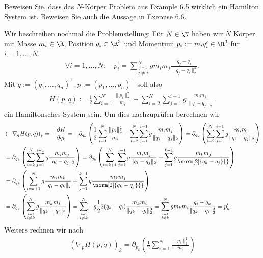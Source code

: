 \begin{exercise}
  Beweisen Sie, dass das $N$-Körper Problem aus Example 6.5
  wirklich ein Hamilton System ist. Beweisen Sie auch die
  Aussage in Exercise 6.6.
\end{exercise}

\begin{solution}
  Wir beschreiben nochmal die Problemstellung: Für $N \in \N$ haben wir $N$ Körper
  mit Masse $m_i \in \R$, Position $q_i \in \R^3$ und Momentum $p_i := m_iq_i^{\prime} \in \R^3$
  für $i = 1,\dots,N$.
  \begin{align*}
    \forall i = 1,\dots,N: \quad p_i^{\prime} = \sum_{\stackrel{j = 1}{j \neq i}}^N gm_im_j \frac{q_j - q_i}{\|q_j - q_i\|_2^3}.
  \end{align*}
  Mit $q := (q_1,\dots,q_n)^{\top}, p := (p_1,\dots,p_n)^{\top}$ soll also
  \begin{align*}
    H(p,q) := \frac{1}{2}\sum_{i=1}^N \frac{\|p_i\|_2^2}{m_i}- \sum_{i = 2}^N\sum_{j=1}^{i-1}g\frac{m_im_j}{\|q_i-q_j\|_2}.
  \end{align*}
  ein Hamiltonsches System sein. Um dies nachzuprüfen berechnen wir
  \begin{align*}
     & \left(- \nabla_q H(p,q)\right)_k = - \frac{\partial H}{\partial q_k}
    = -\partial_{q_k}\left(\frac{1}{2}\sum_{i=1}^N \frac{\|p_i\|_2^2}{m_i}- \sum_{i = 2}^N\sum_{j=1}^{i-1}g\frac{m_im_j}{\|q_i-q_j\|_2}\right)
    = \partial_{q_k}\left(\sum_{i = 2}^N\sum_{j=1}^{i-1}g\frac{m_im_j}{\|q_i-q_j\|_2}\right) \\
    &= \partial_{q_k}\left(\sum_{i = k}^N\sum_{j=1}^{i-1}g\frac{m_im_j}{\|q_i-q_j\|_2}\right)
    = \partial_{q_k}\left(\sum_{i = k+1}^N \sum_{j=1}^{i-1}g\frac{m_im_j}{\|q_i-q_j\|_2}
    + \sum_{j=1}^{k-1}g\frac{m_k m_j}{\norm[2]{q_k-q_j}{}} \right) \\
    &= \partial_{q_k}\left(\sum_{i = k+1}^N g\frac{m_im_k}{\|q_i-q_k\|_2}
    + \sum_{j=1}^{k-1}g\frac{m_k m_j}{\norm[2]{q_k-q_j}{}}\right)\\
    &= \partial_{q_k}\left(\sum_{\stackrel{i = 1}{i \neq k}}^{N}g\frac{m_km_i}{\|q_k-q_i\|_2}\right)
    = \sum_{\stackrel{i = 1}{i \neq k}}^{N}-g\frac{1}{2}2(q_k - q_i)\frac{m_km_i}{\|q_k-q_i\|_2^3}
    = \sum_{\stackrel{i = 1}{i \neq k}}^{N}gm_km_i\frac{q_i - q_k}{\|q_k-q_i\|_2^3} = p_k^{\prime}.
  \end{align*}
  Weiters rechnen wir nach
  \begin{align*}
    \left(\nabla_p H(p,q)\right)_k = \partial_{p_k}\left(\frac{1}{2}\sum_{i=1}^N \frac{\|p_i\|_2^2}{m_i}\right)

\end{align*}
\end{solution}
